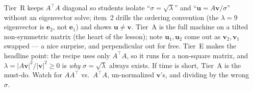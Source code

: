 \documentclass[10pt]{article}
\newcommand{\uu}{\mathbf{u}}
\newcommand{\vv}{\mathbf{v}}
\newcommand{\ee}{\mathbf{e}}
\newcommand{\T}{^{\top}}
\begin{document}
\begin{teachernote}
Tier~R keeps $A\T A$ diagonal so students isolate ``$\sigma=\sqrt\lambda$'' and ``$\uu=A\vv/\sigma$''
without an eigenvector solve; item~2 drills the ordering convention (the $\lambda=9$ eigenvector is
$\ee_2$, not $\ee_1$) and shows $\uu\ne\vv$. Tier~A is the full machine on a tilted non-symmetric matrix
(the heart of the lesson); note $\uu_1,\uu_2$ come out as $\vv_2,\vv_1$ swapped --- a nice surprise, and
perpendicular out for free. Tier~E makes the headline point: the recipe uses only $A\T A$, so it runs for
a non-square matrix, and $\lambda=|A\vv|^2/|\vv|^2\ge0$ is \emph{why} $\sigma=\sqrt\lambda$ always exists.
If time is short, Tier~A is the must-do. Watch for $AA\T$ vs.\ $A\T A$, un-normalized $\vv$'s, and
dividing by the wrong $\sigma$.
\end{teachernote}
\end{document}

